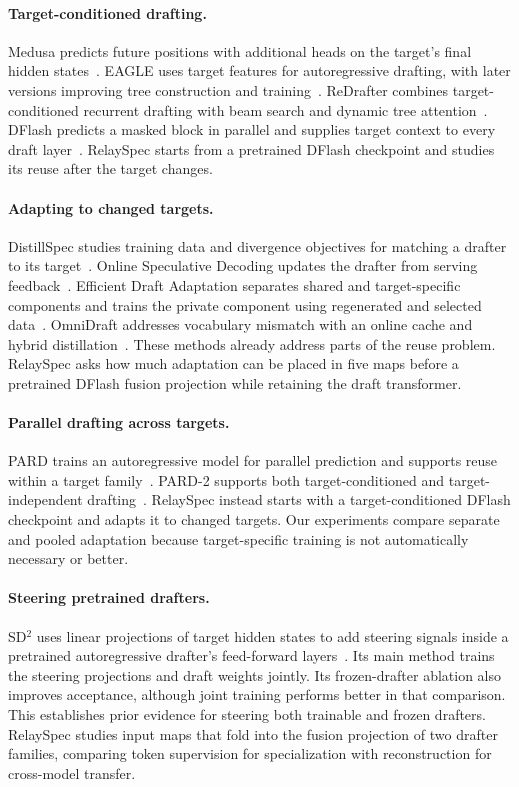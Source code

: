 \paragraph{Target-conditioned drafting.}
Medusa predicts future positions with additional heads on the target's final hidden states~\citep{cai2024medusa}. EAGLE uses target features for autoregressive drafting, with later versions improving tree construction and training~\citep{li2024eagle,li2024eagle2,li2025eagle3}. ReDrafter combines target-conditioned recurrent drafting with beam search and dynamic tree attention~\citep{cheng2024redrafter}. DFlash predicts a masked block in parallel and supplies target context to every draft layer~\citep{chen2026dflash}. RelaySpec starts from a pretrained DFlash checkpoint and studies its reuse after the target changes.

\paragraph{Adapting to changed targets.}
DistillSpec studies training data and divergence objectives for matching a drafter to its target~\citep{zhou2024distillspec}. Online Speculative Decoding updates the drafter from serving feedback~\citep{liu2024online}. Efficient Draft Adaptation separates shared and target-specific components and trains the private component using regenerated and selected data~\citep{lin2026eda}. OmniDraft addresses vocabulary mismatch with an online cache and hybrid distillation~\citep{ramakrishnan2025omnidraft}. These methods already address parts of the reuse problem. RelaySpec asks how much adaptation can be placed in five maps before a pretrained DFlash fusion projection while retaining the draft transformer.

\paragraph{Parallel drafting across targets.}
PARD trains an autoregressive model for parallel prediction and supports reuse within a target family~\citep{an2026pard}. PARD-2 supports both target-conditioned and target-independent drafting~\citep{an2026pard2}. RelaySpec instead starts with a target-conditioned DFlash checkpoint and adapts it to changed targets. Our experiments compare separate and pooled adaptation because target-specific training is not automatically necessary or better.

\paragraph{Steering pretrained drafters.}
SD$^2$ uses linear projections of target hidden states to add steering signals inside a pretrained autoregressive drafter's feed-forward layers~\citep{berdoz2026steering}. Its main method trains the steering projections and draft weights jointly. Its frozen-drafter ablation also improves acceptance, although joint training performs better in that comparison. This establishes prior evidence for steering both trainable and frozen drafters. RelaySpec studies input maps that fold into the fusion projection of two drafter families, comparing token supervision for specialization with reconstruction for cross-model transfer.

